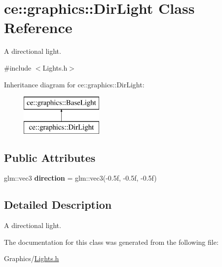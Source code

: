 \hypertarget{classce_1_1graphics_1_1_dir_light}{}\section{ce\+:\+:graphics\+:\+:Dir\+Light Class Reference}
\label{classce_1_1graphics_1_1_dir_light}


A directional light.  




{\ttfamily \#include $<$Lights.\+h$>$}

Inheritance diagram for ce\+:\+:graphics\+:\+:Dir\+Light\+:\begin{figure}[H]
\begin{center}
\leavevmode
\includegraphics[height=2.000000cm]{classce_1_1graphics_1_1_dir_light}
\end{center}
\end{figure}
\subsection*{Public Attributes}
\begin{DoxyCompactItemize}
\item 
\mbox{\label{classce_1_1graphics_1_1_dir_light_a5903f80742e62c8a0fc11499287ca770}} 
glm\+::vec3 {\bfseries direction} = glm\+::vec3(-\/0.\+5f, -\/0.\+5f, -\/0.\+5f)
\end{DoxyCompactItemize}


\subsection{Detailed Description}
A directional light. 

The documentation for this class was generated from the following file\+:\begin{DoxyCompactItemize}
\item 
Graphics/\hyperlink{_lights_8h}{Lights.\+h}\end{DoxyCompactItemize}
